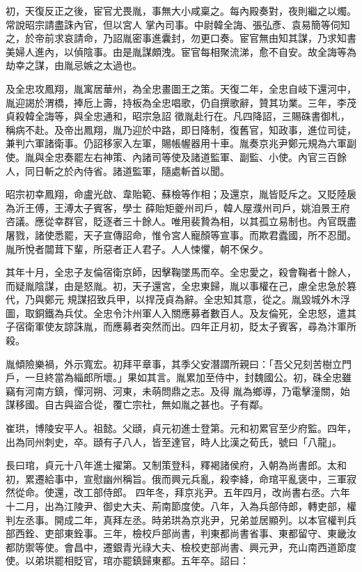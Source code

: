 \begin{pinyinscope}
 初，天復反正之後，宦官尤畏胤，事無大小咸稟之。每內殿奏對，夜則繼之以燭。常說昭宗請盡誅內官，但以宮人
 掌內司事。中尉韓全誨、張弘彥、袁易簡等伺知之，於帝前求哀請命，乃詔胤密事進囊封，勿更口奏。宦官無由知其謀，乃求知書美婦人進內，以偵陰事。由是胤謀頗洩。宦官每相聚流涕，愈不自安。故全誨等為劫幸之謀，由胤忌嫉之太過也。



 及全忠攻鳳翔，胤寓居華州，為全忠畫圖王之策。天復二年，全忠自岐下還河中，胤迎謁於渭橋，捧卮上壽，持板為全忠唱歌，仍自撰歌辭，贊其功業。三年，李茂貞殺韓全誨等，與全忠通和，昭宗急詔
 徵胤赴行在。凡四降詔，三賜硃書御札，稱病不赴。及帝出鳳翔，胤乃迎於中路，即日降制，復舊官，知政事，進位司徒，兼判六軍諸衛事。仍詔移家入左軍，賜帳幄器用十車。胤奏京兆尹鄭元規為六軍副使。胤與全忠奏罷左右神策、內諸司等使及諸道監軍、副監、小使。內官三百餘人，同日斬之於內侍省。諸道監軍，隨處斬首以聞。



 昭宗初幸鳳翔，命盧光啟、韋貽範、蘇檢等作相；及還京，胤皆貶斥之。又貶陸扆為沂王傅，王溥太子賓客，學士
 薛貽矩夔州司戶，韓人屋濮州司戶，姚洎景王府咨議。應從幸群官，貶逐者三十餘人。唯用裴贄為相，以其孤立易制也。內官既盡屠戮，諸使悉罷，天子宣傳詔命，惟令宮人寵顏等宣事。而欺君蠹國，所不忍聞。胤所悅者闒茸下輩，所惡者正人君子。人人悚懼，朝不保夕。



 其年十月，全忠子友倫宿衛京師，因擊鞠墜馬而卒。全忠愛之，殺會鞠者十餘人，而疑胤陰謀，由是怒胤。初，天子還宮，全忠東歸，胤以事權在己，慮全忠急於篡代，乃與鄭元
 規謀招致兵甲，以捍茂貞為辭。全忠知其意，從之。胤毀城外木浮圖，取銅鐵為兵仗。全忠令汴州軍人入關應募者數百人。及友倫死，全忠怒，遣其子宿衛軍使友諒誅胤，而應募者突然而出。四年正月初，貶太子賓客，尋為汴軍所殺。



 胤傾險樂禍，外示寬宏。初拜平章事，其季父安潛謂所親曰：「吾父兄刻苦樹立門戶，一旦終當為緇郎所壞。」果如其言。胤累加至侍中，封魏國公。初，硃全忠雖竊有河南方鎮，憚河朔、河東，未萌問鼎之志。及得
 胤為鄉導，乃電擊潼關，始謀移國。自古與盜合從，覆亡宗社，無如胤之甚也。子有鄰。



 崔珙，博陵安平人。祖懿。父頲，貞元初進士登第。元和初累官至少府監。四年，出為同州刺史，卒。頲有子八人，皆至達官，時人比漢之荀氏，號曰「八龍」。



 長曰琯，貞元十八年進士擢第。又制策登科，釋褐諸侯府，入朝為尚書郎。太和初，累遷給事中，宣慰幽州稱旨。俄而興元兵亂，殺李絳，命琯平亂褒中，三軍寂然從命。使還，改工部侍郎。
 四年冬，拜京兆尹。五年四月，改尚書右丞。六年十二月，出為江陵尹、御史大夫、荊南節度使。八年，入為兵部侍郎，轉吏部，權判左丞事。開成二年，真拜左丞。時弟珙為京兆尹，兄弟並居顯列。以本官權判兵部西銓、吏部東銓事。三年，檢校戶部尚書，判東都尚書省事、東都留守、東畿汝都防禦等使。會昌中，遷銀青光祿大夫、檢校吏部尚書、興元尹，充山南西道節度使。以弟珙罷相貶官，琯亦罷鎮歸東都。五年卒。詔曰：




\end{pinyinscope}
